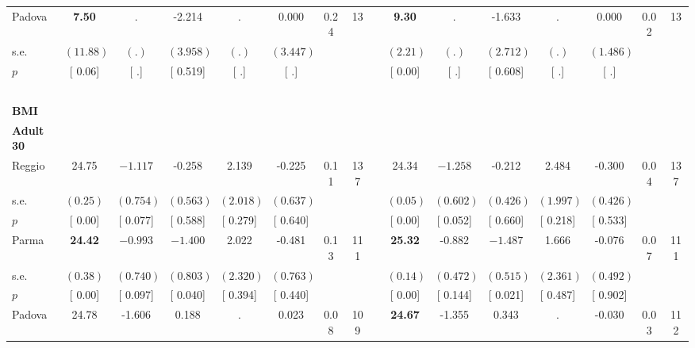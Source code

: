 \begin{longtable}{L{8em} c c c c c c c p{1em} c c c c c c c}
\quad \quad \quad Padova& \textbf{     7.50} &         . &    -2.214 &         . &     0.000 &      0.24 &        13 & & \textbf{     9.30} &         . &    -1.633 &         . &     0.000 &      0.02 &        13  \\*
\quad \quad \quad \quad s.e.& $ (    11.88)$ & $ (        .)$ & $ (    3.958)$ & $ (        .)$ & $ (    3.447)$ & & & & $ (     2.21)$ & $ (        .)$ & $ (    2.712)$ & $ (        .)$ & $ (    1.486)$ & &  \\*
\quad \quad \quad \quad $ p$ & [     0.06] & [        .] & [    0.519] & [        .] & [        .] & & & & [     0.00] & [        .] & [    0.608] & [        .] & [        .] & &  \\[1em]
~\\[1em]
\textbf{BMI} \\*
\quad \quad \textbf{Adult 30} & & & & & & & & & & & & & & & \\* 
\quad \quad \quad Reggio& 24.75 & $ \mathbf{   -1.117}$ &    -0.258 &     2.139 &    -0.225 &      0.11 &       137 & & 24.34 & $ \mathbf{   -1.258}$ &    -0.212 &     2.484 &    -0.300 &      0.04 &       137  \\*
\quad \quad \quad \quad s.e.& $ (     0.25)$ & $ (    0.754)$ & $ (    0.563)$ & $ (    2.018)$ & $ (    0.637)$ & & & & $ (     0.05)$ & $ (    0.602)$ & $ (    0.426)$ & $ (    1.997)$ & $ (    0.426)$ & &  \\*
\quad \quad \quad \quad $ p$ & [     0.00] & [    0.077] & [    0.588] & [    0.279] & [    0.640] & & & & [     0.00] & [    0.052] & [    0.660] & [    0.218] & [    0.533] & &  \\[1em]
\quad \quad \quad Parma& \textbf{    24.42} & $ \mathbf{   -0.993}$ & $ \mathbf{   -1.400}$ &     2.022 &    -0.481 &      0.13 &       111 & & \textbf{    25.32} &    -0.882 & $ \mathbf{   -1.487}$ &     1.666 &    -0.076 &      0.07 &       111  \\*
\quad \quad \quad \quad s.e.& $ (     0.38)$ & $ (    0.740)$ & $ (    0.803)$ & $ (    2.320)$ & $ (    0.763)$ & & & & $ (     0.14)$ & $ (    0.472)$ & $ (    0.515)$ & $ (    2.361)$ & $ (    0.492)$ & &  \\*
\quad \quad \quad \quad $ p$ & [     0.00] & [    0.097] & [    0.040] & [    0.394] & [    0.440] & & & & [     0.00] & [    0.144] & [    0.021] & [    0.487] & [    0.902] & &  \\[1em]
\quad \quad \quad Padova& 24.78 &    -1.606 &     0.188 &         . &     0.023 &      0.08 &       109 & & \textbf{    24.67} &    -1.355 &     0.343 &         . &    -0.030 &      0.03 &       112  \\*

\end{longtable}
